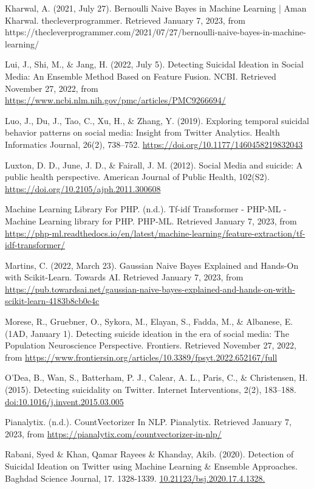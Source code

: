 \documentclass[runningheads]{llncs}
\begin{document}
\begin{thebibliography}{9}
\bibitem{}
Kharwal, A. (2021, July 27). Bernoulli Naive Bayes in Machine Learning | Aman Kharwal. thecleverprogrammer. Retrieved January 7, 2023, from https://thecleverprogrammer.com/2021/07/27/bernoulli-naive-bayes-in-machine-learning/

\bibitem{}
Lui, J., Shi, M., \& Jang, H. (2022, July 5). Detecting Suicidal Ideation in Social Media: An Ensemble Method Based on Feature Fusion. NCBI. Retrieved November 27, 2022, from \url{https://www.ncbi.nlm.nih.gov/pmc/articles/PMC9266694/}

\bibitem{}
Luo, J., Du, J., Tao, C., Xu, H., \& Zhang, Y. (2019). Exploring temporal suicidal behavior patterns on social media: Insight from Twitter Analytics. Health Informatics Journal, 26(2), 738–752. \url{https://doi.org/10.1177/1460458219832043}

\bibitem{}
Luxton, D. D., June, J. D., \& Fairall, J. M. (2012). Social Media and suicide: A public health perspective. American Journal of Public Health, 102(S2). \url{https://doi.org/10.2105/ajph.2011.300608}

\bibitem{}
Machine Learning Library For PHP. (n.d.). Tf-idf Transformer - PHP-ML - Machine Learning library for PHP. PHP-ML. Retrieved January 7, 2023, from \url{https://php-ml.readthedocs.io/en/latest/machine-learning/feature-extraction/tf-idf-transformer/}

\bibitem{}
Martins, C. (2022, March 23). Gaussian Naive Bayes Explained and Hands-On with Scikit-Learn. Towards AI. Retrieved January 7, 2023, from \url{https://pub.towardsai.net/gaussian-naive-bayes-explained-and-hands-on-with-scikit-learn-4183b8cb0e4c}

\bibitem{}
Morese, R., Gruebner, O., Sykora, M., Elayan, S., Fadda, M., \& Albanese, E. (1AD, January 1). Detecting suicide ideation in the era of social media: The Population Neuroscience Perspective. Frontiers. Retrieved November 27, 2022, from \url{https://www.frontiersin.org/articles/10.3389/fpsyt.2022.652167/full}

\bibitem{}
O’Dea, B., Wan, S., Batterham, P. J., Calear, A. L., Paris, C., \& Christensen, H. (2015). Detecting suicidality on Twitter. Internet Interventions, 2(2), 183–188. \url{doi:10.1016/j.invent.2015.03.005}

\bibitem{}
Pianalytix. (n.d.). CountVectorizer In NLP. Pianalytix. Retrieved January 7, 2023, from \url{https://pianalytix.com/countvectorizer-in-nlp/}

\bibitem{}
Rabani, Syed \& Khan, Qamar Rayees & Khanday, Akib. (2020). Detection of Suicidal Ideation on Twitter using Machine Learning & Ensemble Approaches. Baghdad Science Journal, 17. 1328-1339. \url{10.21123/bsj.2020.17.4.1328.}


\end{thebibliography}
\end{document}
